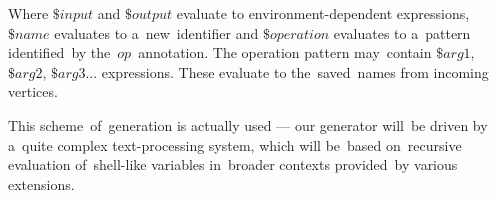 Where $\$input$ and $\$output$ evaluate to environment-dependent expressions, $\$name$ evaluates to a~new~identifier and $\$operation$ evaluates to a~pattern identified~by the~$op$~annotation. The operation pattern may~contain $\$arg1$, $\$arg2$, $\$arg3$... expressions. These evaluate to the~saved~names from incoming vertices.

\parspace

This scheme~of~generation is actually used --- our generator will~be driven by a~quite complex text-processing system, which will be~based on~recursive evaluation of~shell-like variables in~broader contexts provided~by various extensions.

